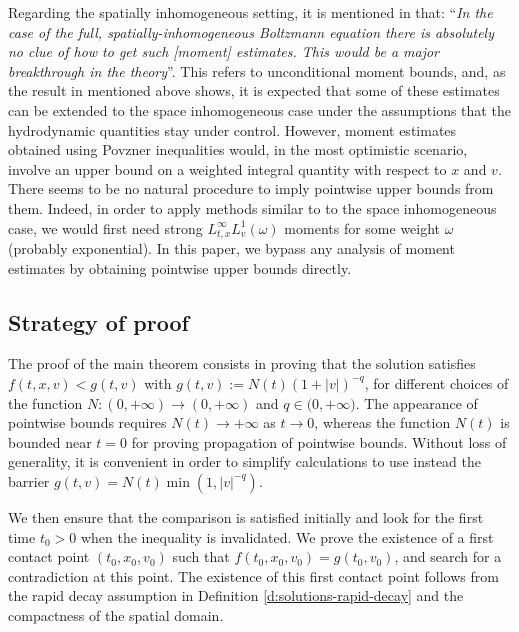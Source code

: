 \documentclass[JEP,XML,SOM,Unicode,NoFloatCountersInSection]{cedram}
\theoremstyle{plain}
\theoremstyle{definition}
\numberwithin{equation}{section}
\let\A N
\begin{document}
Regarding the spatially inhomogeneous setting, it is mentioned in
\cite[Chap.\,2, \S2]{villani-book} that: ``\textit{In the case
of the full, spatially-inhomogeneous Boltzmann equation there is
absolutely no clue of how to get such [moment] estimates. This would
be a major breakthrough in the theory}''. This refers to
unconditional moment bounds, and, as the result in
\cite[\S 5]{GMM} mentioned above shows, it is expected that some
of these estimates can be extended to the space inhomogeneous case
under the assumptions that the hydrodynamic quantities stay under
control. However, moment estimates obtained using Povzner inequalities
would, in the most optimistic scenario, involve an upper bound on a
weighted integral quantity with respect to $x$ and $v$. There seems to
be no natural procedure to imply pointwise upper bounds from
them. Indeed, in order to apply methods similar to
\cite{gamba-panferov-villani-2009,bobylev2017upper,gamba2017pointwise}
to the space inhomogeneous case, we would first need strong
$L^\infty_{t,x} L^1_v(\omega)$ moments for some weight $\omega$
(probably exponential). In this paper, we bypass any analysis of
moment estimates by obtaining pointwise upper bounds directly.

\subsection{Strategy of proof}

The proof of the main theorem consists in proving that the solution
satisfies $f(t,x,v) < g(t,v)$ with $g(t,v) := \A(t) (1 + |v|)^{-q}$,
for different choices of the function
$\A: (0,+\infty) \to (0,+\infty)$ and $q \in \mathbb (0,+\infty)$. The
appearance of pointwise bounds requires $\A(t) \to +\infty$ as
$t \to 0$, whereas the function $\A(t)$ is bounded near $t=0$ for
proving propagation of pointwise bounds. Without loss of generality,
it is convenient in order to simplify calculations to use instead the
barrier $g(t,v) = N(t) \min(1,|v|^{-q})$.

We then ensure that the comparison is satisfied initially and look for
the first time $t_0 >0$ when the inequality is invalidated. We prove
the existence of a first contact point $(t_0,x_0,v_0)$ such that
$f(t_0,x_0,v_0) = g(t_0,v_0)$, and search for a
contradiction at this point. The existence of this first contact point
follows from the rapid decay assumption in Definition
\ref{d:solutions-rapid-decay} and the compactness of the spatial domain.
\end{document}
